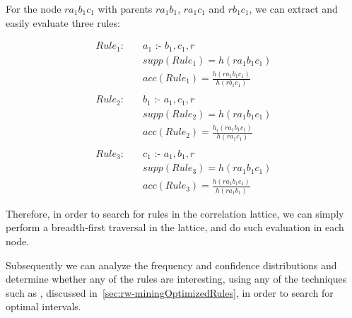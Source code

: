 For the node $r a_1 b_1 c_1$ with parents $r a_1 b_1$, $r a_1 c_1$ and $r b_1 c_1$, we can extract and easily evaluate three rules:

\begin{align*}
Rule_1: \quad &a_1\text{ :- }b_1,c_1,r \\ 
&supp(Rule_1) = h(r a_1 b_1 c_1) \\
&acc(Rule_1) = \frac{h(r a_1 b_1 c_1)}{h(r b_1 c_1)} \\ \\
Rule_2: \quad &b_1\text{ :- }a_1,c_1,r \\
 &supp(Rule_2) = h(r a_1 b_1 c_1) \\
 &acc(Rule_2) = \frac{h_i(r a_1 b_1 c_1)}{h(r a_1 c_1)} \\ \\
Rule_3: \quad &c_1\text{ :- }a_1,b_1,r \\
 &supp(Rule_3) = h(r a_1 b_1 c_1) \\
 &acc(Rule_3) = \frac{h(r a_1 b_1 c_1)}{h(r a_1 b_1)} 
\end{align*}

Therefore, in order to search for rules in the correlation lattice, we can simply perform a breadth-first traversal in
the lattice, and do such evaluation in each node. 

Subsequently we can analyze the frequency and confidence distributions and determine whether any of the rules are
interesting, using any of the techniques such as \citet{Brin99miningoptimized}, discussed
in~\ref{sec:rw-miningOptimizedRules}, in order to search for optimal intervals.


% 



